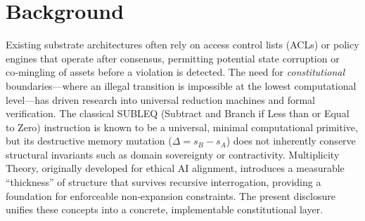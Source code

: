 \documentclass[11pt,a4paper]{article}
\theoremstyle{definition}
\theoremstyle{remark}
\begin{document}
\section{Background}
\label{sec:background}
Existing substrate architectures often rely on access control lists (ACLs) or policy engines that operate after consensus, permitting potential state corruption or co‑mingling of assets before a violation is detected. The need for \emph{constitutional} boundaries—where an illegal transition is impossible at the lowest computational level—has driven research into universal reduction machines and formal verification. The classical SUBLEQ (Subtract and Branch if Less than or Equal to Zero) instruction is known to be a universal, minimal computational primitive, but its destructive memory mutation ($\Delta = s_B - s_A$) does not inherently conserve structural invariants such as domain sovereignty or contractivity. Multiplicity Theory, originally developed for ethical AI alignment, introduces a measurable “thickness” of structure that survives recursive interrogation, providing a foundation for enforceable non‑expansion constraints. The present disclosure unifies these concepts into a concrete, implementable constitutional layer.
\end{document}
